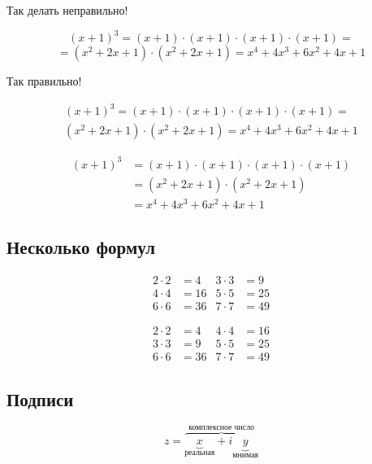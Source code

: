 \documentclass[12pt, a4paper]{article}
\begin{document}

Так делать неправильно!

\[  (x+1)^3 = (x+1) \cdot (x+1) \cdot (x+1) \cdot (x+1) = \]
\[= (x^2 + 2x + 1) \cdot (x^2 + 2x + 1) = x^4 + 4x^3 + 6x^2 + 4x+ 1 \]

Так правильно!

\begin{multline}
	(x+1)^3 = (x+1) \cdot (x+1) \cdot (x+1) \cdot (x+1) = \\ 
	(x^2 + 2x + 1) \cdot (x^2 + 2x + 1) = x^4 + 4x^3 + 6x^2 + 4x+ 1 
\end{multline}


\begin{align*}
	(x+1)^3 & = (x+1) \cdot (x+1) \cdot (x+1) \cdot (x+1) \\ 
	        & = (x^2 + 2x + 1)  \cdot (x^2 + 2x + 1)    \\ 
	        & =  x^4 + 4x^3 + 6x^2 + 4x+ 1  
\end{align*}



\subsection{Несколько формул}

\begin{align}
	2 \cdot 2 &= 4 & 3  \cdot 3 &= 9 \\
	4 \cdot 4 &= 16 & 5 \cdot 5 &= 25 \\
	6 \cdot 6 &= 36 & 7 \cdot 7 &= 49 
\end{align}

\begin{equation}
	\begin{aligned}
		2 \cdot 2 &= 4 & 4 \cdot 4 &= 16 \\
		3 \cdot 3 &= 9 & 5 \cdot 5 &= 25 \\
		6 \cdot 6 &= 36 & 7 \cdot 7 &= 49 
	\end{aligned}
\end{equation}




\subsection{Подписи}

\[
 z = \overbrace{
   \underbrace{x}_\text{реальная} + i
   \underbrace{y}_\text{мнимая}
  }^\text{комплексное число}
\]
\end{document}
